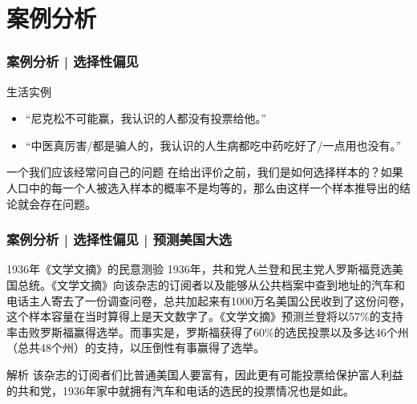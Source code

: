 \section{案例分析}
\begin{frame}
  \frametitle{案例分析 | 选择性偏见}
  \begin{block}{生活实例}
    \begin{itemize}
      \item “尼克松不可能赢，我认识的人都没有投票给他。”
      \item “中医真厉害/都是骗人的，我认识的人生病都吃中药吃好了/一点用也没有。”
    \end{itemize}
  \end{block}
  \pause
  \begin{block}{一个我们应该经常问自己的问题}
    在给出评价之前，我们是如何选择样本的？如果人口中的每一个人被选入样本的概率不是均等的，那么由这样一个样本推导出的结论就会存在问题。
  \end{block}
\end{frame}

\begin{frame}
  \frametitle{案例分析 | 选择性偏见 | 预测美国大选}
  \begin{block}{1936年《文学文摘》的民意测验}
    1936年，共和党人兰登和民主党人罗斯福竞选美国总统。《文学文摘》向该杂志的订阅者以及能够从公共档案中查到地址的汽车和电话主人寄去了一份调查问卷，总共加起来有1000万名美国公民收到了这份问卷，这个样本容量在当时算得上是天文数字了。《文学文摘》预测兰登将以57\%的支持率击败罗斯福赢得选举。而事实是，罗斯福获得了60\%的选民投票以及多达46个州（总共48个州）的支持，以压倒性有事赢得了选举。
  \end{block}
  \pause
  \begin{block}{解析}
    该杂志的订阅者们比普通美国人要富有，因此更有可能投票给保护富人利益的共和党，1936年家中就拥有汽车和电话的选民的投票情况也是如此。
  \end{block}
\end{frame}

